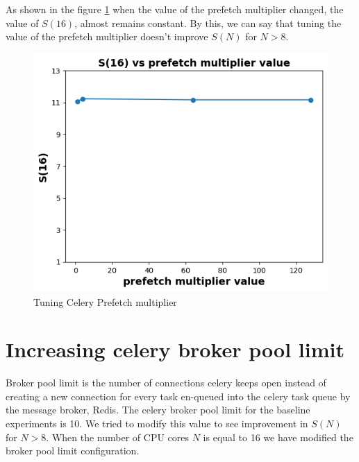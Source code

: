 \documentclass{iitbreport}
\begin{document}
As shown in the figure \ref{prefetch_multiplier_plot} when the value of the prefetch multiplier changed, the value of $S(16)$,  almost remains constant. By this, we can say that tuning the value of the prefetch multiplier doesn’t improve   $S(N)$ for $N>8$.
\begin{figure}[!htb]
  \centering
  \includegraphics[width=\linewidth]{Images/prefetch_multiplier.png}
  \caption{Tuning Celery Prefetch multiplier}
  \label{prefetch_multiplier_plot}
\end{figure}
\section{Increasing celery broker pool limit}
Broker pool limit is the number of connections celery keeps open instead of creating a new connection for every task en-queued into the celery task queue by the message broker, Redis. The celery broker pool limit for the baseline experiments is 10. We tried to modify this value to see improvement in $S(N)$ for $N>8$. When the number of CPU cores $N$ is equal to 16 we have modified the broker pool limit configuration. 
\end{document}

